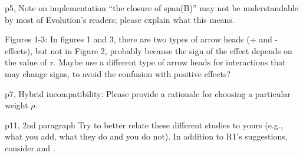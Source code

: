 \begin{point}{p5, Note on implementation}
    ``the closure of span(B)'' may not be
    understandable by most of Evolution's readers; please explain what this means.
\end{point}


\begin{point}{Figures 1-3:}
    In figures 1 and 3, there are two types of arrow heads (+ and -
effects), but not in Figure 2, probably because the sign of the effect depends
on the value of $\tau$. Maybe use a  different type of arrow heads for
interactions that may change signs, to avoid the confusion with positive
effects?
\end{point}


\begin{point}{p7, Hybrid incompatibility:}
    Please provide a rationale for choosing a particular weight $\rho$.
\end{point}


\begin{point}{p11, 2nd paragraph}
    Try to better relate these different studies to yours
(e.g., what you add, what they do and you do not). In addition to R1's
suggestions, consider \citet{weinreich2013fishers} and \citet{blanquart2016epistasis}.
\end{point}


